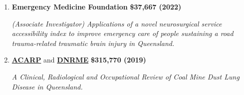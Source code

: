 \begin{enumerate}
	\item
        \textbf{Emergency Medicine Foundation}
		\textbf{\hfill \$37,667 (2022)}\par 
        \textit{(Associate Investigator) Applications of a novel neurosurgical service accessibility index to improve emergency care of people sustaining a road trauma-related traumatic brain injury in Queensland.}
	\item
        \href{https://www.acarp.com.au/funding.aspx}{\textbf{ACARP}} and \href{https://www.resources.qld.gov.au/}{\textbf{DNRME}}
		\textbf{\hfill \$315,770 (2019)}\par 
        \textit{A Clinical, Radiological and Occupational Review of Coal Mine Dust Lung Disease in Queensland.}
\end{enumerate}\par